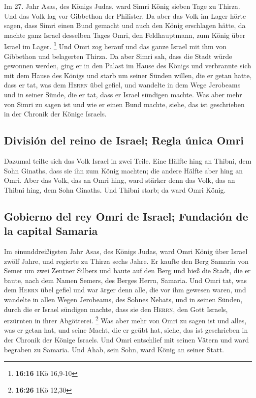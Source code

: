  Im 27. Jahr Asas, des Königs Judas, ward Simri König
sieben Tage zu Thirza. Und das Volk lag vor Gibbethon der Philister.
 Da aber das Volk im Lager hörte sagen, dass Simri einen
Bund gemacht und auch den König erschlagen hätte, da machte ganz Israel
desselben Tages Omri, den Feldhauptmann, zum König über Israel im Lager.
\footnote{\textbf{16:16} 1Kö 16,9-10}  Und Omri zog
herauf und das ganze Israel mit ihm von Gibbethon und belagerten Thirza.
 Da aber Simri sah, dass die Stadt würde gewonnen werden,
ging er in den Palast im Hause des Königs und verbrannte sich mit dem
Hause des Königs und starb  um seiner Sünden willen, die
er getan hatte, dass er tat, was dem \textsc{Herrn} übel gefiel, und
wandelte in dem Wege Jerobeams und in seiner Sünde, die er tat, dass er
Israel sündigen machte.  Was aber mehr von Simri zu sagen
ist und wie er einen Bund machte, siehe, das ist geschrieben in der
Chronik der Könige Israels.

\hypertarget{divisiuxf3n-del-reino-de-israel-regla-uxfanica-omri}{%
\subsection{División del reino de Israel; Regla única
Omri}\label{divisiuxf3n-del-reino-de-israel-regla-uxfanica-omri}}

 Dazumal teilte sich das Volk Israel in zwei Teile. Eine
Hälfte hing an Thibni, dem Sohn Ginaths, dass sie ihn zum König machten;
die andere Hälfte aber hing an Omri.  Aber das Volk, das
an Omri hing, ward stärker denn das Volk, das an Thibni hing, dem Sohn
Ginaths. Und Thibni starb; da ward Omri König.

\hypertarget{gobierno-del-rey-omri-de-israel-fundaciuxf3n-de-la-capital-samaria}{%
\subsection{Gobierno del rey Omri de Israel; Fundación de la capital
Samaria}\label{gobierno-del-rey-omri-de-israel-fundaciuxf3n-de-la-capital-samaria}}

 Im einunddreißigsten Jahr Asas, des Königs Judas, ward
Omri König über Israel zwölf Jahre, und regierte zu Thirza sechs Jahre.
 Er kaufte den Berg Samaria von Semer um zwei Zentner
Silbers und baute auf den Berg und hieß die Stadt, die er baute, nach
dem Namen Semers, des Berges Herrn, Samaria.  Und Omri
tat, was dem \textsc{Herrn} übel gefiel und war ärger denn alle, die vor
ihm gewesen waren,  und wandelte in allen Wegen
Jerobeams, des Sohnes Nebats, und in seinen Sünden, durch die er Israel
sündigen machte, dass sie den \textsc{Herrn}, den Gott Israels,
erzürnten in ihrer Abgötterei. \footnote{\textbf{16:26} 1Kö 12,30}
 Was aber mehr von Omri zu sagen ist und alles, was er
getan hat, und seine Macht, die er geübt hat, siehe, das ist geschrieben
in der Chronik der Könige Israels.  Und Omri entschlief
mit seinen Vätern und ward begraben zu Samaria. Und Ahab, sein Sohn,
ward König an seiner Statt.

